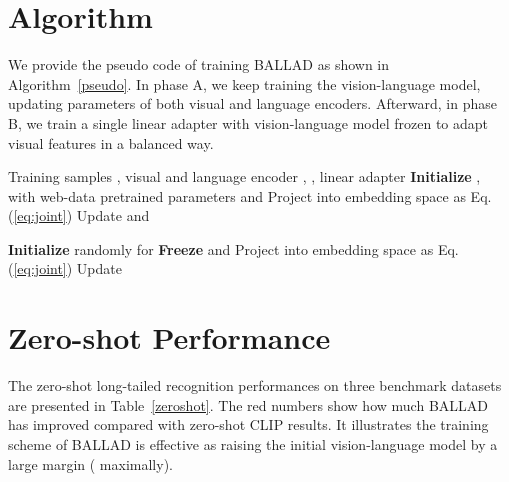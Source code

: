 \documentclass[10pt,twocolumn,letterpaper]{article}
\newcommand{\approach}{\textsc{BALLAD}}
\begin{document}
\section{Algorithm}
\label{algorithm}
We provide the pseudo code of training \approach{} as shown in Algorithm~\ref{pseudo}. In phase A, we keep training the vision-language model, updating parameters of both visual and language encoders. Afterward, in phase B, we train a single linear adapter with vision-language model frozen to adapt visual features in a balanced way. 
\begin{algorithm}
\caption{Two-phases training of \approach{}}
\label{pseudo}
\begin{algorithmic}
\Require Training samples , visual and language encoder , , linear adapter 
\State \textbf{Initialize} ,  with web-data pretrained parameters   and 
   
\State 
\State 
\State 
\State Project into embedding space  as Eq.(\ref{eq:joint})
\State 
\State Update   and 
\EndFor
\EndFor

\vspace{4pt}
\State \textbf{Initialize}  randomly for   
\State \textbf{Freeze}   and   
\State 
\State 
\State 
\State Project into embedding space  as Eq.(\ref{eq:joint})
\State 
\State Update 
\EndFor
\EndFor
\end{algorithmic}
\end{algorithm}

\section{Zero-shot Performance}
\label{zeroshot-per}
The zero-shot long-tailed recognition performances on three benchmark datasets are presented in Table~\ref{zeroshot}. The red numbers show how much \approach{} has improved compared with zero-shot CLIP results. It illustrates the training scheme of \approach{} is effective as raising the initial vision-language model by a large margin ( maximally).
\end{document}
